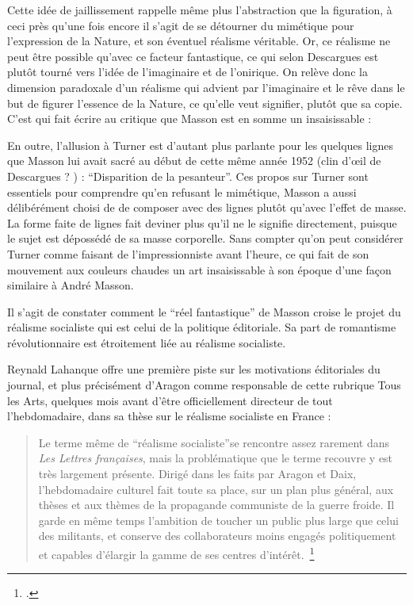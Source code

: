 	  Cette idée de jaillissement rappelle même plus l’abstraction que la figuration, à ceci près qu’une fois encore il s’agit de se détourner du mimétique pour l’expression de la Nature, et son éventuel réalisme véritable. Or, ce réalisme ne peut être possible qu’avec ce facteur fantastique, ce qui selon Descargues est plutôt tourné vers l’idée de l’imaginaire et de l’onirique. On relève donc la dimension paradoxale d’un réalisme qui advient par l’imaginaire et le rêve dans le but de figurer l’essence de la Nature, ce qu’elle veut signifier, plutôt que sa copie. C’est qui fait écrire au critique que Masson est en somme un insaisissable : 
 
En outre, l’allusion à Turner est d’autant plus parlante pour les quelques lignes que Masson lui avait sacré au début de cette même année 1952 (clin d’\oe{}il de Descargues ? ) : \enquote{Disparition de la pesanteur}. Ces propos sur Turner sont essentiels pour comprendre qu’en refusant le mimétique, Masson a aussi délibérément choisi de de composer avec des lignes plutôt qu’avec l’effet de masse. La forme faite de lignes fait deviner plus qu’il ne le signifie directement, puisque le sujet est dépossédé de sa masse corporelle. Sans compter qu’on peut considérer Turner comme faisant de l’impressionniste avant l’heure, ce qui fait de son mouvement aux couleurs chaudes un art insaisissable à son époque d’une façon similaire à André Masson. 

Il  s’agit de constater comment le \enquote{réel fantastique} de Masson  croise le projet du réalisme socialiste qui est celui de la politique éditoriale. Sa part de romantisme révolutionnaire est étroitement liée au réalisme socialiste. 


	Reynald Lahanque offre une première piste sur les motivations éditoriales du journal, et plus précisément d’Aragon comme responsable de cette rubrique Tous les Arts, quelques mois avant d’être officiellement directeur de tout l’hebdomadaire, dans sa thèse sur le réalisme socialiste en France : 

\begin{quote}
Le terme même de \enquote{réalisme socialiste}se rencontre assez rarement dans \emph{Les Lettres françaises}, mais la problématique que le terme recouvre y est très largement présente. Dirigé dans les faits par Aragon et Daix, l'hebdomadaire culturel fait toute sa place, sur un plan plus général, aux thèses et aux thèmes de la propagande communiste de la guerre froide. Il garde en même temps l'ambition de toucher un public plus large que celui des militants, et conserve des collaborateurs moins engagés politiquement et capables d'élargir la gamme de ses centres d’intérêt. \footcite{}\end{quote}

